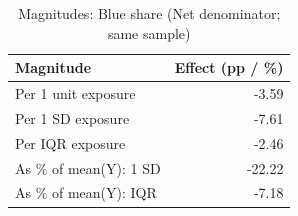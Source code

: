 \begin{table}

\caption{Magnitudes: Blue share (Net denominator; same sample)}
\centering
\begin{tabular}[t]{lr}
\toprule
Magnitude & Effect (pp / \%)\\
\midrule
Per 1 unit exposure & -3.59\\
Per 1 SD exposure & -7.61\\
Per IQR exposure & -2.46\\
As \% of mean(Y): 1 SD & -22.22\\
As \% of mean(Y): IQR & -7.18\\
\bottomrule
\end{tabular}
\end{table}
